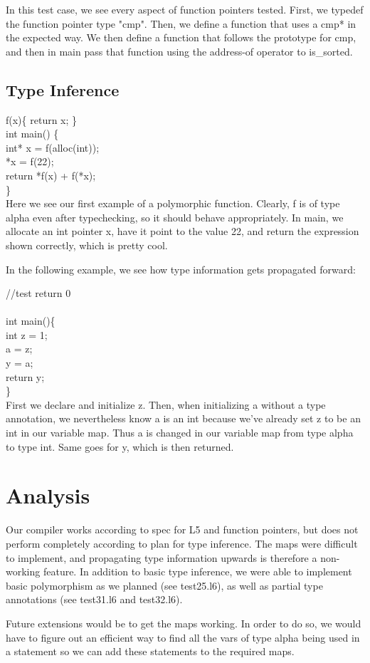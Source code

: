 \documentclass{article}
\begin{document}
In this test case, we see every aspect of function pointers tested. First, we typedef the function pointer type "cmp". Then, we define a function that uses a cmp* in the expected way. We then define a function that follows the prototype for cmp, and then in main pass that function using the address-of operator to is\_sorted. 

\subsection{Type Inference}

f(x)\{ return x; \}\\

int main() \{\\
  int* x = f(alloc(int));\\
  *x = f(22);\\
  return *f(x) + f(*x);\\
\}\\

Here we see our first example of a polymorphic function. Clearly, f is of type alpha even after typechecking, so it should behave appropriately. In main, we allocate an int pointer x, have it point to the value 22, and return the expression shown correctly, which is pretty cool.

In the following example, we see how type information gets propagated forward:

//test return 0\\
\\
int main()\{\\
  int z = 1;\\
  a = z;\\
  y = a;\\
  return y;\\
\}\\

First we declare and initialize z. Then, when initializing a without a type annotation, we nevertheless know a is an int because we've already set z to be an int in our variable map. Thus a is changed in our variable map from type alpha to type int. Same goes for y, which is then returned.

\section{Analysis}

Our compiler works according to spec for L5 and function pointers, but does not perform completely according to plan for type inference. The maps were difficult to implement, and propagating type information upwards is therefore a non-working feature. In addition to basic type inference, we were able to implement basic polymorphism as we planned (see test25.l6), as well as partial type annotations (see test31.l6 and test32.l6).

Future extensions would be to get the maps working. In order to do so, we would have to figure out an efficient way to find all the vars of type alpha being used in a statement so we can add these statements to the required maps. 
 
\end{document}
